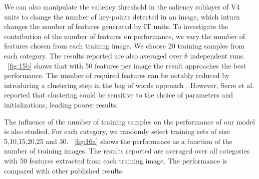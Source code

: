 \documentclass[9pt,twocolumn]{article}
\begin{document}
We can also manipulate the saliency threshold in the saliency sublayer of V4 units
to change the number of key-points detected in an image,
which inturn changes the number of features generated by IT units.
To investigate the contribution of the number of features on performance,
we vary the number of features chosen from each training image.
We choose 20 training samples from each category.
The results reported are also averaged over 8 independent runs.
\figurename~\ref{fig:15b} shows that 
with 50 features per image the result approaches the best performance.
The number of required features can be notably reduced by introducing 
a clustering step in the bag of words approach \cite{csurka2004}.
However, Serre et al. \cite{serre2007} reported that clustering could
be sensitive to the choice of parameters and initializations,
leading poorer results.

The influence of the number of training samples 
on the performance of our model is also studied.
For each category, we randomly select training sets of size
5,10,15,20,25 and 30.
\figurename~\ref{fig:16a} shows the performance as
a function of the number of training images.
The results reported are averaged over all categories
with 50 features extracted from each training image.
The performance is compared with other published results.
\end{document}
